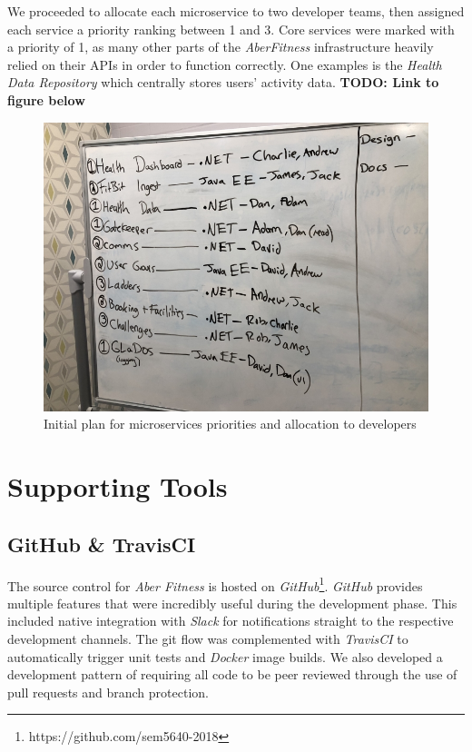 We proceeded to allocate each microservice to two developer teams, then assigned each service a priority ranking between 1 and 3. Core services were marked with a priority of 1, as many other parts of the \textit{AberFitness} infrastructure heavily relied on their APIs in order to function correctly. One examples is the \textit{Health Data Repository} which centrally stores users' activity data.  \textbf{TODO: Link to figure below}

\begin{figure}[H]
    \centering
    \includegraphics[width=\textwidth]{Images/Numbering_Microservices.jpg}
    \caption{Initial plan for microservices priorities and allocation to developers}
\end{figure}


\section{Supporting Tools}
\subsection{GitHub \& TravisCI}
The source control for \textit{Aber Fitness} is hosted on \textit{GitHub}\footnote{https://github.com/sem5640-2018}. \textit{GitHub} provides multiple features that were incredibly useful during the development phase. This included native integration with \textit{Slack} for notifications straight to the respective development channels. The git flow was complemented with \textit{TravisCI} to automatically trigger unit tests and \textit{Docker} image builds. We also developed a development pattern of requiring all code to be peer reviewed through the use of pull requests and branch protection.

